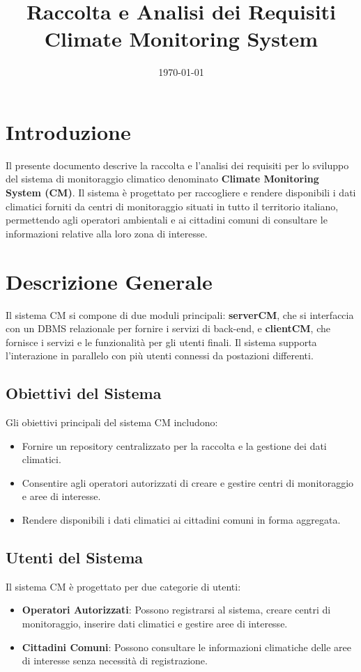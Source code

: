 \documentclass[a4paper,12pt]{article}
\title{Raccolta e Analisi dei Requisiti\\ \textbf{Climate Monitoring System}}
\author{}
\date{\today}
\begin{document}
\maketitle
\tableofcontents
\newpage

\section{Introduzione}
Il presente documento descrive la raccolta e l'analisi dei requisiti per lo sviluppo del sistema di monitoraggio climatico denominato \textbf{Climate Monitoring System (CM)}. Il sistema è progettato per raccogliere e rendere disponibili i dati climatici forniti da centri di monitoraggio situati in tutto il territorio italiano, permettendo agli operatori ambientali e ai cittadini comuni di consultare le informazioni relative alla loro zona di interesse.

\section{Descrizione Generale}
Il sistema CM si compone di due moduli principali: \textbf{serverCM}, che si interfaccia con un DBMS relazionale per fornire i servizi di back-end, e \textbf{clientCM}, che fornisce i servizi e le funzionalità per gli utenti finali. Il sistema supporta l'interazione in parallelo con più utenti connessi da postazioni differenti.

\subsection{Obiettivi del Sistema}
Gli obiettivi principali del sistema CM includono:
\begin{itemize}
    \item Fornire un repository centralizzato per la raccolta e la gestione dei dati climatici.
    \item Consentire agli operatori autorizzati di creare e gestire centri di monitoraggio e aree di interesse.
    \item Rendere disponibili i dati climatici ai cittadini comuni in forma aggregata.
\end{itemize}

\subsection{Utenti del Sistema}
Il sistema CM è progettato per due categorie di utenti:
\begin{itemize}
    \item \textbf{Operatori Autorizzati}: Possono registrarsi al sistema, creare centri di monitoraggio, inserire dati climatici e gestire aree di interesse.
    \item \textbf{Cittadini Comuni}: Possono consultare le informazioni climatiche delle aree di interesse senza necessità di registrazione.
\end{itemize}
\end{document}
